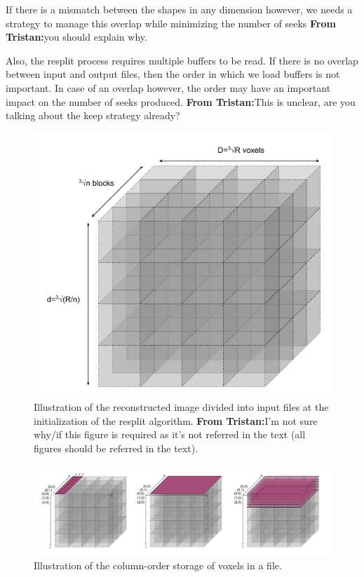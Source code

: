 \documentclass[conference]{IEEEtran}
\newcommand{\tristan}[1]{\color{orange}\textbf{From Tristan:}#1\color{black}}
\begin{document}
If there is a mismatch between the shapes in any dimension however, we
needs a strategy to manage this overlap while minimizing the number of
seeks \tristan{you should explain why}.

Also, the resplit process requires multiple buffers to be read. If there is
no overlap between input and output files, then the order in which we load
buffers is not important. In case of an overlap however, the order may have
an important impact on the number of seeks produced. \tristan{This is unclear, are you talking about the keep strategy already?}



\begin{figure}[h!]
\centering
\includegraphics[scale=0.4]{./figures/reconstructed_img_divided.png}
\caption{Illustration of the reconstructed image divided into input files
at the initialization of the resplit algorithm. \tristan{I'm not sure
why/if this figure is required as it's not referred in the text (all
figures should be referred in the text).}
}
\label{fig:reconstructed_img_divided}
\end{figure}

\begin{figure}[h!]
\centering
\includegraphics[scale=0.3]{./figures/column_order.png}
\caption{Illustration of the column-order storage of voxels in a file.
}
\label{fig:column_order}
\end{figure}
\end{document}
